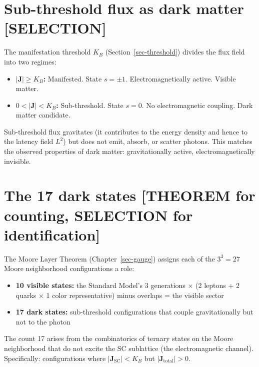 \documentclass[
  11pt,
  letterpaper,
  twoside,
  openany]{book}
\makeatletter
\providecommand{\tightlist}{%
  \setlength{\itemsep}{0pt}\setlength{\parskip}{0pt}}
\let\orig@section\section
\renewcommand{\section}{\needspace{8\baselineskip}\orig@section}
\makeatother
\begin{document}
\section{Sub-threshold flux as dark matter
{[}SELECTION{]}}\label{sub-threshold-flux-as-dark-matter-selection}

The manifestation threshold \(K_B\) (Section~\ref{sec-threshold})
divides the flux field into two regimes:

\begin{itemize}
\tightlist
\item
  \textbf{\(|\mathbf{J}| \geq K_B\):} Manifested. State \(s = \pm 1\).
  Electromagnetically active. Visible matter.
\item
  \textbf{\(0 < |\mathbf{J}| < K_B\):} Sub-threshold. State \(s = 0\).
  No electromagnetic coupling. Dark matter candidate.
\end{itemize}

Sub-threshold flux gravitates (it contributes to the energy density and
hence to the latency field \(L^2\)) but does not emit, absorb, or
scatter photons. This matches the observed properties of dark matter:
gravitationally active, electromagnetically invisible.

\section{The 17 dark states {[}THEOREM for counting, SELECTION for
identification{]}}\label{the-17-dark-states-theorem-for-counting-selection-for-identification}

The Moore Layer Theorem (Chapter~\ref{sec-gauge}) assigns each of the
\(3^3 = 27\) Moore neighborhood configurations a role:

\begin{itemize}
\tightlist
\item
  \textbf{10 visible states:} the Standard Model's 3 generations
  \(\times\) (2 leptons + 2 quarks \(\times\) 1 color representative)
  minus overlaps = the visible sector
\item
  \textbf{17 dark states:} sub-threshold configurations that couple
  gravitationally but not to the photon
\end{itemize}

The count 17 arises from the combinatorics of ternary states on the
Moore neighborhood that do not excite the SC sublattice (the
electromagnetic channel). Specifically: configurations where
\(|\mathbf{J}_\text{SC}| < K_B\) but \(|\mathbf{J}_\text{total}| > 0\).
\end{document}
